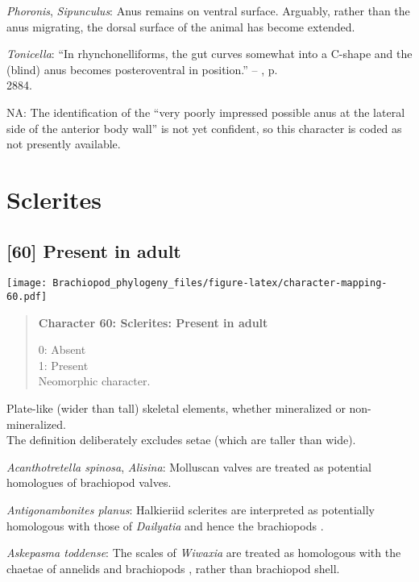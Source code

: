 \documentclass[openany]{book}
\theoremstyle{definition}
\theoremstyle{definition}
\theoremstyle{definition}
\theoremstyle{remark}
\begin{document}
\hypertarget{Phoronis-coding-59}{}
\emph{Phoronis}, \emph{Sipunculus}: Anus remains on ventral surface.
Arguably, rather than the anus migrating, the dorsal surface of the
animal has become extended.

\hypertarget{Tonicella-coding-59}{}
\emph{Tonicella}: ``In rhynchonelliforms, the gut curves somewhat into a
C-shape and the (blind) anus becomes posteroventral in position.'' --
\citet{Williams2007Supplement}, p.\\
2884.

\hypertarget{NA-coding-59}{}
NA: The identification of the ``very poorly impressed possible anus at
the lateral side of the anterior body wall'' is not yet confident, so
this character is coded as not presently available.

\section{Sclerites}\label{sclerites}

\subsection*{{[}60{]} Present in adult}\label{present-in-adult}

\texttt{[image: Brachiopod\_phylogeny\_files/figure-latex/character-mapping-60.pdf]}

\begin{quote}
\textbf{Character 60: Sclerites: Present in adult}

0: Absent\\
1: Present\\
Neomorphic character.
\end{quote}

Plate-like (wider than tall) skeletal elements, whether mineralized or
non-mineralized.\\
The definition deliberately excludes setae (which are taller than wide).

\hypertarget{Acanthotretella_spinosa-coding-60}{}
\emph{Acanthotretella spinosa}, \emph{Alisina}: Molluscan valves are
treated as potential homologues of brachiopod valves.

\hypertarget{Antigonambonites_planus-coding-60}{}
\emph{Antigonambonites planus}: Halkieriid sclerites are interpreted as
potentially homologous with those of \emph{Dailyatia} and hence the
brachiopods \citep{Zhao2017}.

\hypertarget{Askepasma_toddense-coding-60}{}
\emph{Askepasma toddense}: The scales of \emph{Wiwaxia} are treated as
homologous with the chaetae of annelids and brachiopods
\citep{Butterfield1990, Smith2014, Zhang2015}, rather than brachiopod
shell.
\end{document}
